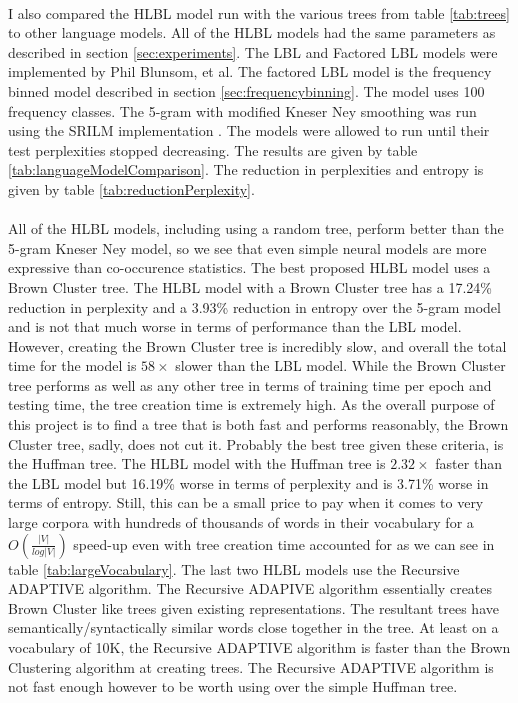 \documentclass[12pt]{ociamthesis}  %
\begin{document}
\paragraph{}
I also compared the HLBL model run with the various trees from table \ref{tab:trees} to other language models. All of the HLBL models had the same parameters as described in section \ref{sec:experiments}. The LBL and Factored LBL models were implemented by Phil Blunsom, et al. The factored LBL model is the frequency binned model described in section \ref{sec:frequencybinning}. The model uses 100 frequency classes. The 5-gram with modified Kneser Ney smoothing was run using the SRILM implementation \cite{Alumae2010}. The models were allowed to run until their test perplexities stopped decreasing. The results are given by table \ref{tab:languageModelComparison}. The reduction in perplexities and entropy is given by table \ref{tab:reductionPerplexity}. 

\paragraph{}
All of the HLBL models, including using a random tree, perform better than the 5-gram Kneser Ney model,  so we see that even simple neural models are more expressive than co-occurence statistics. The best proposed HLBL model uses a Brown Cluster tree. The HLBL model with a Brown Cluster tree has a 17.24\% reduction in perplexity and a 3.93\% reduction in entropy over the 5-gram model and is not that much worse in terms of performance than the LBL model. However, creating the Brown Cluster tree is incredibly slow, and overall the total time for the model is $58\times$ slower than the LBL model. While the Brown Cluster tree performs as well as any other tree in terms of training time per epoch and testing time, the tree creation time is extremely high. As the overall purpose of this project is to find a tree that is both fast and performs reasonably, the Brown Cluster tree, sadly, does not cut it. Probably the best tree given these criteria, is the Huffman tree. The HLBL model with the Huffman tree is $2.32\times$ faster than the LBL model but 16.19\% worse in terms of perplexity and is 3.71\% worse in terms of entropy. Still, this can be a small price to pay when it comes to very large corpora with hundreds of thousands of words in their vocabulary for a $O(\frac{|V|}{log|V|})$ speed-up even with tree creation time accounted for as we can see in table \ref{tab:largeVocabulary}. The last two HLBL models use the Recursive ADAPTIVE algorithm. The Recursive ADAPIVE algorithm essentially creates Brown Cluster like trees given existing representations. The resultant trees have semantically/syntactically similar words close together in the tree. At least on a vocabulary of 10K, the Recursive ADAPTIVE algorithm is faster than the Brown Clustering algorithm at creating trees. The Recursive ADAPTIVE algorithm is not fast enough however to be worth using over the simple Huffman tree. 
\end{document}
